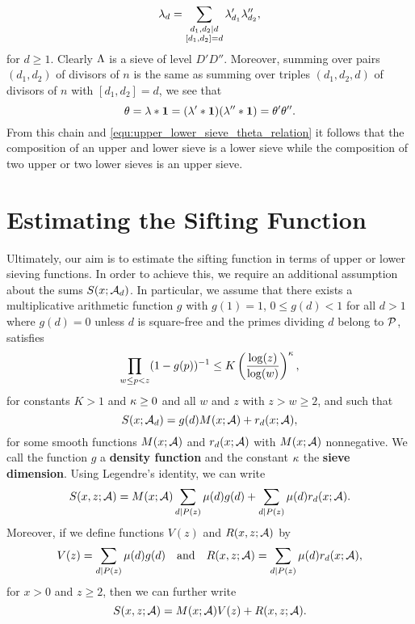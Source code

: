 \documentclass[12pt,oneside]{book}
\begin{document}
    \[
      \lambda_{d} = \sum_{\substack{ d_{1},d_{2} \mid d \\ [d_{1},d_{2}] = d}}\lambda'_{d_{1}}\lambda''_{d_{2}},
    \]
    for $d \ge 1$. Clearly $\Lambda$ is a sieve of level $D'D''$. Moreover, summing over pairs $(d_{1},d_{2})$ of divisors of $n$ is the same as summing over triples $(d_{1},d_{2},d)$ of divisors of $n$ with $[d_{1},d_{2}] = d$, we see that
    \[
      \theta = \lambda \ast \mathbf{1} = (\lambda' \ast \mathbf{1})(\lambda'' \ast \mathbf{1}) = \theta'\theta''.
    \]
    From this chain and \cref{equ:upper_lower_sieve_theta_relation} it follows that the composition of an upper and lower sieve is a lower sieve while the composition of two upper or two lower sieves is an upper sieve.
  \section{Estimating the Sifting Function}
    Ultimately, our aim is to estimate the sifting function in terms of upper or lower sieving functions. In order to achieve this, we require an additional assumption about the sums $S(x;\mathcal{A}_{d})$. In particular, we assume that there exists a multiplicative arithmetic function $g$ with $g(1) = 1$, $0 \le g(d) < 1$ for all $d > 1$ where $g(d) = 0$ unless $d$ is square-free and the primes dividing $d$ belong to $\mathcal{P}$, satisfies
    \begin{equation}\label{equ:prod_assumption_density_function_1}
      \prod_{w \le p < z}(1-g(p))^{-1} \le K\left(\frac{\log(z)}{\log(w)}\right)^{\kappa},
    \end{equation}
    for constants $K > 1$ and $\kappa \ge 0$ and all $w$ and $z$ with $z > w \ge 2$, and such that  
    \begin{equation}\label{equ:d_multiple_sifting_function_estimate}
      S(x;\mathcal{A}_{d}) = g(d)M(x;\mathcal{A})+r_{d}(x;\mathcal{A}),
    \end{equation}
    for some smooth functions $M(x;\mathcal{A})$ and $r_{d}(x;\mathcal{A})$ with $M(x;\mathcal{A})$ nonnegative. We call the function $g$ a \textbf{density function} and the constant $\kappa$ the \textbf{sieve dimension}. Using Legendre's identity, we can write
    \[
      S(x,z;\mathcal{A}) = M(x;\mathcal{A})\sum_{d \mid P(z)}\mu(d)g(d)+\sum_{d \mid P(z)}\mu(d)r_{d}(x;\mathcal{A}).
    \]
    Moreover, if we define functions $V(z)$ and $R(x,z;\mathcal{A})$ by
    \[
      V(z) = \sum_{d \mid P(z)}\mu(d)g(d) \quad \text{and} \quad R(x,z;\mathcal{A}) = \sum_{d \mid P(z)}\mu(d)r_{d}(x;\mathcal{A}),
    \]
    for $x > 0$ and $z \ge 2$, then we can further write
    \[
      S(x,z;\mathcal{A}) = M(x;\mathcal{A})V(z)+R(x,z;\mathcal{A}).
    \]
\end{document}

